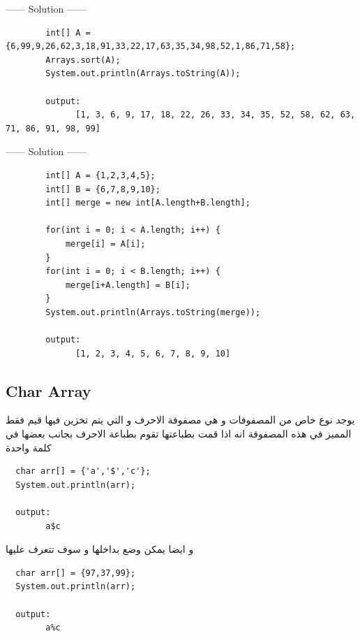 \begin{example}
              
  \begin{center}
    ------ \textcolor{Solution}{Solution} ------ 
  \end{center}
  \begin{verbatim}
        int[] A = {6,99,9,26,62,3,18,91,33,22,17,63,35,34,98,52,1,86,71,58};
        Arrays.sort(A);
        System.out.println(Arrays.toString(A));

        output:
              [1, 3, 6, 9, 17, 18, 22, 26, 33, 34, 35, 52, 58, 62, 63, 71, 86, 91, 98, 99]
  \end{verbatim}
\end{example}
\begin{example}
  \begin{center}
    ------ \textcolor{Solution}{Solution} ------ 
  \end{center}
  \begin{verbatim}
        int[] A = {1,2,3,4,5};
        int[] B = {6,7,8,9,10};
        int[] merge = new int[A.length+B.length];

        for(int i = 0; i < A.length; i++) {
            merge[i] = A[i];
        }
        for(int i = 0; i < B.length; i++) {
            merge[i+A.length] = B[i];
        }
        System.out.println(Arrays.toString(merge));

        output:
              [1, 2, 3, 4, 5, 6, 7, 8, 9, 10]
  \end{verbatim}
\end{example}




\subsection{Char Array}
\begin{AR}
يوجد نوع خاص من المصفوفات و هي مصفوفة الاحرف و التي يتم تخزين فيها قيم 
 فقط
المميز في هذه المصفوفة انه اذا قمت بطباعتها تقوم بطباعة الاحرف بجانب بعضها في كلمة واحدة
\end{AR}
\begin{verbatim}
  char arr[] = {'a','$','c'};
  System.out.println(arr);

  output:
        a$c
\end{verbatim}
\begin{AR}
    و ايضا يمكن وضع بداخلها و سوف تتعرف عليها
\end{AR}
\begin{verbatim}
  char arr[] = {97,37,99};
  System.out.println(arr);

  output:
        a%c
\end{verbatim}

